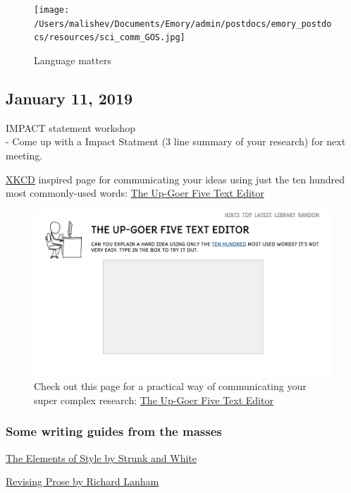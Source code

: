 \documentclass[10,portrait]{article}
\begin{document}
\begin{figure}
\centering
\texttt{[image: /Users/malishev/Documents/Emory/admin/postdocs/emory\_postdocs/resources/sci\_comm\_GOS.jpg]}
\caption{Language matters}
\end{figure}

\newpage    

\subsection{January 11, 2019}\label{january-11-2019}

IMPACT statement workshop\\
- Come up with a Impact Statment (3 line summary of your research) for
next meeting.

\href{https://xkcd.com/}{XKCD} inspired page for communicating your
ideas using just the ten hundred most commonly-used words:
\href{http://splasho.com/upgoer5/}{The Up-Goer Five Text Editor}

\begin{figure}
\centering
\includegraphics{upgoer5.jpeg}
\caption{Check out this page for a practical way of communicating your
super complex research: \href{http://splasho.com/upgoer5/}{The Up-Goer
Five Text Editor}}
\end{figure}

\subsubsection{Some writing guides from the
masses}\label{some-writing-guides-from-the-masses}

\href{https://www.amazon.com/Elements-Style-William-Strunk-Jr/dp/194564401X}{The
Elements of Style by Strunk and White}

\href{http://people.vetmed.wsu.edu/jmgay/courses/documents/TheParamedicMethod.pdf}{Revising
Prose by Richard Lanham}
\end{document}
